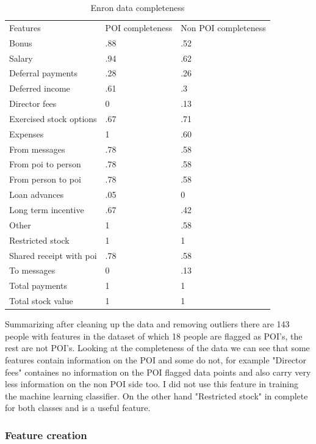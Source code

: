 \documentclass[12pt]{article}%
\begin{document}
\newpage
\begin{table}[!htb]
\centering
\caption{Enron data completeness}
\label{my-label}
\begin{tabular}{lll}
 Features & POI completeness & Non POI completeness \\
 Bonus & .88 & .52 \\
 Salary & .94 & .62 \\
 Deferral payments & .28 & .26 \\
 Deferred income & .61 & .3 \\
 Director fees & 0 & .13 \\
 Exercised stock options & .67 & .71 \\
 Expenses & 1 & .60 \\
 From messages & .78 & .58 \\
 From poi to person & .78 & .58 \\
 From person to poi & .78 & .58 \\
 Loan advances & .05 & 0 \\
 Long term incentive & .67 & .42 \\
 Other & 1 & .58 \\
 Restricted stock & 1 & 1 \\
 Shared receipt with poi & .78 & .58 \\
 To messages & 0 & .13 \\
 Total payments & 1 & 1 \\
 Total stock value & 1 & 1 \\
 
\end{tabular}
\end{table}

Summarizing after cleaning up the data and removing outliers there are 143 people with features in the dataset of which 18 people are flagged as POI's, the rest are not POI's. Looking at the completeness of the data we can see that some features contain information on the POI and some do not, for example "Director fees" containes no information on the POI flagged data points and also carry very less information on the non POI side too. I did not use this feature in training the machine learning classifier. On the other hand "Restricted stock" in complete for both classes and is a useful feature.

\subsubsection*{Feature creation}
\end{document}

